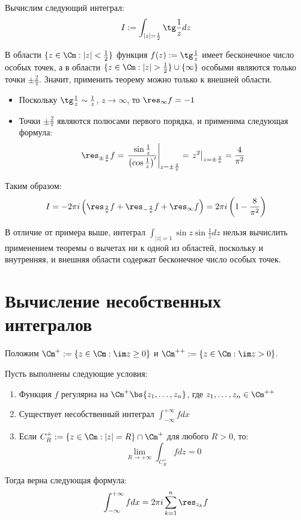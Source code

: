 \begin{example}
	Вычислим следующий интеграл:
	\[I := \int_{|z| = \frac12} \tg\frac1z dz\]
	
	В области $\{z \in \Cm: |z| < \frac12\}$ функция $f(z) := \tg\frac1z$ имеет бесконечное число особых точек, а в области $\{z \in \Cm: |z| > \frac12\} \cup \{\infty\}$ особыми являются только точки $\pm \frac2\pi$. Значит, применить теорему можно только к внешней области.
	\begin{itemize}
		\item Поскольку $\tg\frac1z \sim \frac1z$, $z \to \infty$, то $\res_\infty{f} = -1$
		
		\item Точки $\pm\frac2\pi$ являются полюсами первого порядка, и применима следующая формула:
		\[\res_{\pm\frac2\pi}{f} = \left.\frac{\sin\frac1z}{\left(\cos\frac1z\right)'}\right|_{z = \pm\frac2\pi} = \left.z^2\right|_{z = \pm\frac2\pi} = \frac4{\pi^2}\]
	\end{itemize}
	
	Таким образом:
	\[I = -2\pi i\left(\res_{\frac2\pi}f + \res_{-\frac2\pi}f + \res_{\infty}f\right) = 2\pi i\left(1 - \frac8{\pi^2}\right)\]
\end{example}

\begin{note}
	В отличие от примера выше, интеграл $\int_{|z| = 1}\sin{z}\sin\frac1zdz$ нельзя вычислить применением теоремы о вычетах ни к одной из областей, поскольку и внутренняя, и внешняя области содержат бесконечное число особых точек.
\end{note}

\section{Вычисление несобственных интегралов}

Положим $\Cm^+ := \{z \in \Cm: \im z \ge 0\}$ и $\Cm^{++} := \{z \in \Cm: \im z > 0\}$.

\begin{proposition}[лемма <<$+$>>]
	Пусть выполнены следующие условия:
	\begin{enumerate}
		\item Функция $f$ регулярна на $\Cm^+ \bs \{z_1, \dotsc, z_n\}$, где $z_1, \dotsc, z_n \in \Cm^{++}$
		\item Существует несобственный интеграл $\int_{-\infty}^{+\infty}fdx$
		\item Если $C_R^+ := \{z \in \Cm: |z| = R\} \cap \Cm^+$ для любого $R > 0$, то:
		\[\lim_{R\to +\infty} \int_{C_R^+}fdz = 0\]
	\end{enumerate}
	
	Тогда верна следующая формула:
	\[\int_{-\infty}^{+\infty}fdx = 2\pi i\sum_{k = 1}^n\res_{z_k}{f}\]
\end{proposition}

